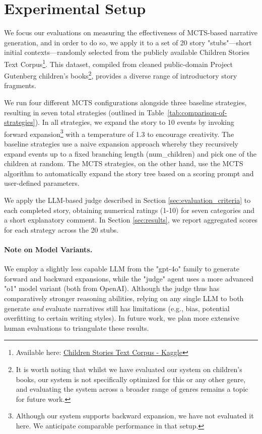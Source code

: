 \documentclass[11pt]{article}
\begin{document}
\section{Experimental Setup}\label{sec:exp}

We focus our evaluations on measuring the effectiveness of MCTS-based narrative generation, and in order to do so, we apply it to a set of 20 story "stubs"—short initial contexts—randomly selected from the publicly available Children Stories Text Corpus\footnote{Available here: \href{https://www.kaggle.com/datasets/edenbd/children-stories-text-corpus}{Children Stories Text Corpus - Kaggle}}. This dataset, compiled from cleaned public-domain Project Gutenberg children's books\footnote{It is worth noting that whilst we have evaluated our system on children's books, our system is not specifically optimized for this or any other genre, and evaluating the system across a broader range of genres remains a topic for future work.}, provides a diverse range of introductory story fragments. 

We run four different MCTS configurations alongside three baseline strategies, resulting in seven total strategies (outlined in Table~\ref{tab:comparison-of-strategies}). In all strategies, we expand the story to 10 events by invoking forward expansion\footnote{Although our system supports backward expansion, we have not evaluated it here. We anticipate comparable performance in that setup.} with a temperature of 1.3 to encourage creativity. The baseline strategies use a naive expansion approach whereby they recursively expand events up to a fixed branching length (num\_children) and pick one of the children at random. The MCTS strategies, on the other hand, use the MCTS algorithm to automatically expand the story tree based on a scoring prompt and user-defined parameters.

We apply the LLM-based judge described in Section \ref{sec:evaluation_criteria} to each completed story, obtaining numerical ratings (1-10) for seven categories and a short explanatory comment. In Section \ref{sec:results}, we report aggregated scores for each strategy across the 20 stubs.

\paragraph{Note on Model Variants.}
We employ a slightly less capable LLM from the "gpt-4o" family to generate forward and backward expansions, while the "judge" agent uses a more advanced "o1" model variant (both from OpenAI). Although the judge thus has comparatively stronger reasoning abilities, relying on any single LLM to both generate \emph{and} evaluate narratives still has limitations (e.g., bias, potential overfitting to certain writing styles). In future work, we plan more extensive human evaluations to triangulate these results.
\end{document}
